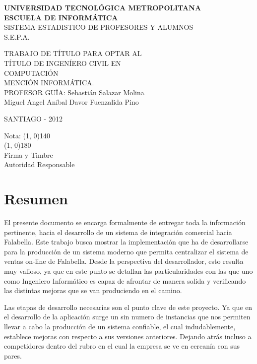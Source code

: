 \documentclass[a4paper,12pt,openany,oneside]{book}
\begin{document}
\thispagestyle{empty}
\begin{center}
\textbf{UNIVERSIDAD TECNOLÓGICA METROPOLITANA\\
ESCUELA DE INFORMÁTICA}\\
\vspace{3cm}
SISTEMA ESTADISTICO DE PROFESORES Y ALUMNOS\\S.E.P.A.
\end{center}
\begin{flushright}
TRABAJO DE TÍTULO PARA OPTAR AL\\
TÍTULO DE INGENÍERO CIVIL EN\\
COMPUTACIÓN\\
MENCIÓN INFORMÁTICA.\\
\vspace{3cm}
PROFESOR GUÍA: Sebastián Salazar Molina\\
\vspace{1.5cm}
Miguel Angel Aníbal Davor Fuenzalida Pino
\end{flushright}
\vspace{4cm}
\begin{center}
SANTIAGO - 2012
\end{center}
\newpage
\thispagestyle{empty}
\begin{flushright}
\vspace{20mm}
Nota: \line(1, 0){140} \\
\vspace{30 mm}
\line(1, 0){180}\\	
Firma y Timbre\\
Autoridad Responsable
\end{flushright}
\chapter*{Resumen}
\thispagestyle{empty}
El presente documento se encarga formalmente de entregar toda la información pertinente, hacia el desarrollo de un sistema de integración comercial hacia Falabella. Este trabajo busca mostrar la implementación que ha de desarrollarse para la producción de un sistema moderno que permita centralizar el sistema de ventas on-line de Falabella. Desde la perspectiva del desarrollador, esto resulta  muy valioso, ya que en este punto se detallan las particularidades con las que uno como Ingeniero Informático es capaz de afrontar de manera solida y verificando las distintas mejoras que se van produciendo en el camino.

Las etapas de desarrollo necesarias son el punto clave de este proyecto. Ya que en el desarrollo de la aplicación surge un sin numero de instancias que nos permiten llevar a cabo la producción de un sistema confiable, el cual indudablemente, establece mejoras con respecto a sus versiones anteriores. Dejando atrás incluso a competidores dentro del rubro en el cual la empresa se ve en cercanía con sus pares.
\tableofcontents
\listoffigures
\end{document}
